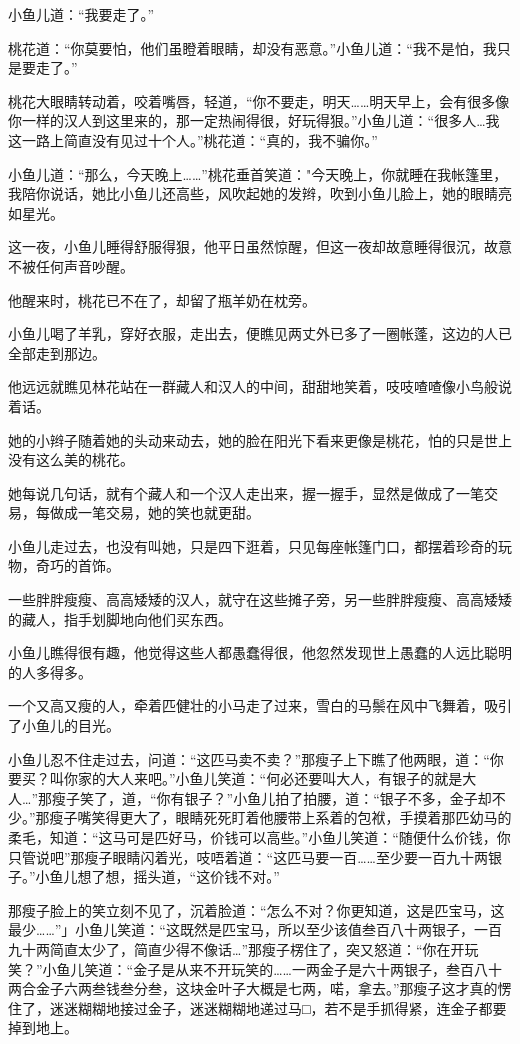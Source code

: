 \documentclass[12pt,oneside]{book}
\begin{document}
小鱼儿道：``我要走了。''

桃花道：``你莫要怕，他们虽瞪着眼睛，却没有恶意。''小鱼儿道：``我不是怕，我只是要走了。''

桃花大眼睛转动着，咬着嘴唇，轻道，``你不要走，明天\ldots\ldots 明天早上，会有很多像你一样的汉人到这里来的，那一定热闹得很，好玩得狠。''小鱼儿道：``很多人\ldots 我这一路上简直没有见过十个人。''桃花道：``真的，我不骗你。''

小鱼儿道：``那么，今天晚上\ldots\ldots{}''桃花垂首笑道："今天晚上，你就睡在我帐篷里，我陪你说话，她比小鱼儿还高些，风吹起她的发辫，吹到小鱼儿脸上，她的眼睛亮如星光。

这一夜，小鱼儿睡得舒服得狠，他平日虽然惊醒，但这一夜却故意睡得很沉，故意不被任何声音吵醒。

他醒来时，桃花已不在了，却留了瓶羊奶在枕旁。

小鱼儿喝了羊乳，穿好衣服，走出去，便瞧见两丈外已多了一圈帐蓬，这边的人已全部走到那边。

他远远就瞧见林花站在一群藏人和汉人的中间，甜甜地笑着，吱吱喳喳像小鸟般说着话。

她的小辫子随着她的头动来动去，她的脸在阳光下看来更像是桃花，怕的只是世上没有这么美的桃花。

她每说几句话，就有个藏人和一个汉人走出来，握一握手，显然是做成了一笔交易，每做成一笔交易，她的笑也就更甜。

小鱼儿走过去，也没有叫她，只是四下逛着，只见每座帐篷门口，都摆着珍奇的玩物，奇巧的首饰。

一些胖胖瘦瘦、高高矮矮的汉人，就守在这些摊子旁，另一些胖胖瘦瘦、高高矮矮的藏人，指手划脚地向他们买东西。

小鱼儿瞧得很有趣，他觉得这些人都愚蠢得很，他忽然发现世上愚蠢的人远比聪明的人多得多。

一个又高又瘦的人，牵着匹健壮的小马走了过来，雪白的马鬃在风中飞舞着，吸引了小鱼儿的目光。

小鱼儿忍不住走过去，问道：``这匹马卖不卖？''那瘦子上下瞧了他两眼，道：``你要买？叫你家的大人来吧。''小鱼儿笑道：``何必还要叫大人，有银子的就是大人\ldots{}''那瘦子笑了，道，``你有银子？''小鱼儿拍了拍腰，道：``银子不多，金子却不少。''那瘦子嘴笑得更大了，眼睛死死盯着他腰带上系着的包袱，手摸着那匹幼马的柔毛，知道：``这马可是匹好马，价钱可以高些。''小鱼儿笑道：``随便什么价钱，你只管说吧''那瘦子眼睛闪着光，吱唔着道：``这匹马要一百\ldots\ldots 至少要一百九十两银子。''小鱼儿想了想，摇头道，``这价钱不对。''

那瘦子脸上的笑立刻不见了，沉着脸道：``怎么不对？你更知道，这是匹宝马，这最少\ldots\ldots{}''」小鱼儿笑道：``这既然是匹宝马，所以至少该值叁百八十两银子，一百九十两简直太少了，简直少得不像话\ldots{}''那瘦子楞住了，突又怒道：``你在开玩笑？''小鱼儿笑道：``金子是从来不开玩笑的\ldots\ldots 一两金子是六十两银子，叁百八十两合金子六两叁钱叁分叁，这块金叶子大概是七两，喏，拿去。''那瘦子这才真的愣住了，迷迷糊糊地接过金子，迷迷糊糊地递过马□，若不是手抓得紧，连金子都要掉到地上。
\end{document}
